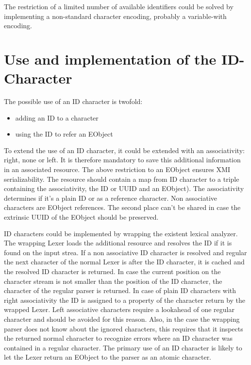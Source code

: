 The restriction of a limited number of available identifiers could be solved by implementing a non-standard character encoding, probably a variable-with encoding.

\section{Use and implementation of the ID-Character}
The possible use of an ID character is twofold:
\begin{itemize}
	\item adding an ID to a character
	\item using the ID to refer an EObject
\end{itemize}
To extend the use of an ID character, it could be extended with an associativity: right, none or left.
It is therefore mandatory to save this additional information in an associated resource. The above restriction to an EObject ensures XMI serializability. The resource should contain a map from ID character to a triple containing the associativity, the ID or UUID and an EObject). The associativity determines if it's a plain ID or as a reference character. Non associative characters are EObject references. The second place can't be shared in case the extrinsic UUID of the EObject should be preserved.

ID characters could be implemented by wrapping the existent lexical analyzer. The wrapping Lexer loads the additional resource and resolves the ID if it is found on the input strea. If a non associative ID character is resolved and regular the next character of the normal Lexer is after the ID character, it is cached and the resolved ID character is returned. In case the current position on the character stream is not smaller than the position of the ID character, the character of the regular parser is returned. In case of plain ID characters with right associativity the ID is assigned to a property of the character return by the wrapped Lexer. Left associative characters require a lookahead of one regular character and should be avoided for this reason. Also, in the case the wrapping parser does not know about the ignored characters, this requires that it inspects the returned normal character to recognize errors where an ID character was contained in a regular character. The primary use of an ID character is likely to let the Lexer return an EObject to the parser as an atomic character.

